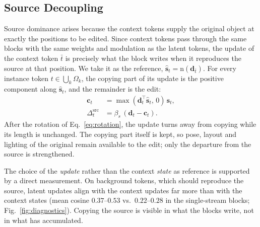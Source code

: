 \subsection{Source Decoupling}  %
\label{sec:source}

Source dominance arises because the context tokens supply the original object at exactly the positions to
be edited. Since context tokens pass through the same blocks with the same weights and modulation as the
latent tokens, the update of the context token $\bar t$ is precisely what the block writes when it reproduces
the source at that position. We take it as the reference,
$\hat{\mathbf{s}}_t = \mathrm{n}(\mathbf{d}_{\bar t})$.
For every instance token $t \in \bigcup_k \Omega_k$, the copying part of its update is the positive component
along $\hat{\mathbf{s}}_t$, and the remainder is the edit:
\begin{align}
  \mathbf{c}_t &= \max(\mathbf{d}_t^{\top}\hat{\mathbf{s}}_t,\,0)\,\hat{\mathbf{s}}_t , \\
  \Delta^{\mathrm{src}}_t &= \beta_s\,(\mathbf{d}_t - \mathbf{c}_t) .
\end{align}
After the rotation of Eq.~\eqref{eq:rotation}, the update turns away from copying while its length is
unchanged. The copying part itself is kept, so pose, layout and lighting of the original remain available to
the edit; only the departure from the source is strengthened.

The choice of the \emph{update} rather than the context \emph{state} as reference is supported by a direct
measurement. On background tokens, which should reproduce the source, latent updates align with the context
updates far more than with the context states (mean cosine $0.37$--$0.53$ vs.\ $0.22$--$0.28$ in the
single-stream blocks; Fig.~\ref{fig:diagnostics}). Copying the source is visible in what the blocks write,
not in what has accumulated.

